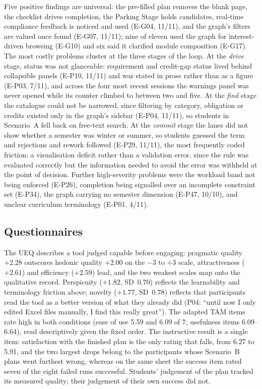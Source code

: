 \documentclass[a4paper,twoside]{article}
\begin{document}
Five positive findings are universal: the pre-filled plan removes the blank page, the checklist drives completion, the Parking Stage holds candidates, real-time compliance feedback is noticed and used (E-G04, 11/11), and the graph's filters are valued once found (E-G07, 11/11); nine of eleven used the graph for interest-driven browsing (E-G10) and six said it clarified module composition (E-G17). The most costly problems cluster at the three stages of the loop. At the \emph{drive} stage, status was not glanceable: requirement and credit-gap status lived behind collapsible panels (E-P10, 11/11) and was stated in prose rather than as a figure (E-P03, 7/11), and across the four most recent sessions the warnings panel was never opened while its counter climbed to between two and five. At the \emph{find} stage the catalogue could not be narrowed, since filtering by category, obligation or credits existed only in the graph's sidebar (E-P04, 11/11), so students in Scenario~A fell back on free-text search. At the \emph{commit} stage the lanes did not show whether a semester was winter or summer, so students guessed the term and rejections and rework followed (E-P29, 11/11), the most frequently coded friction: a visualisation deficit rather than a validation error, since the rule was evaluated correctly but the information needed to avoid the error was withheld at the point of decision. Further high-severity problems were the workload band not being enforced (E-P26), completion being signalled over an incomplete constraint set (E-P34), the graph carrying no semester dimension (E-P47, 10/10), and unclear curriculum terminology (E-P01, 4/11).

\subsection{Questionnaires}

The UEQ describes a tool judged capable before engaging: pragmatic quality $+2.28$ outscores hedonic quality $+2.00$ on the $-3$ to $+3$ scale, attractiveness ($+2.61$) and efficiency ($+2.59$) lead, and the two weakest scales map onto the qualitative record. Perspicuity ($+1.82$, SD~0.70) reflects the learnability and terminology friction above; novelty ($+1.77$, SD~0.78) reflects that participants read the tool as a better version of what they already did (P04: ``until now I only edited Excel files manually, I find this really great''). The adapted TAM items rate high in both conditions (ease of use 5.59 and 6.09 of 7; usefulness items 6.09--6.64), read descriptively given the fixed order. The instructive result is a single item: satisfaction with the finished plan is the only rating that falls, from 6.27 to 5.91, and the two largest drops belong to the participants whose Scenario~B plans went furthest wrong, whereas on the same sheet the success item rated seven of the eight failed runs successful. Students' judgement of the plan tracked its measured quality; their judgement of their own success did not.
\end{document}
